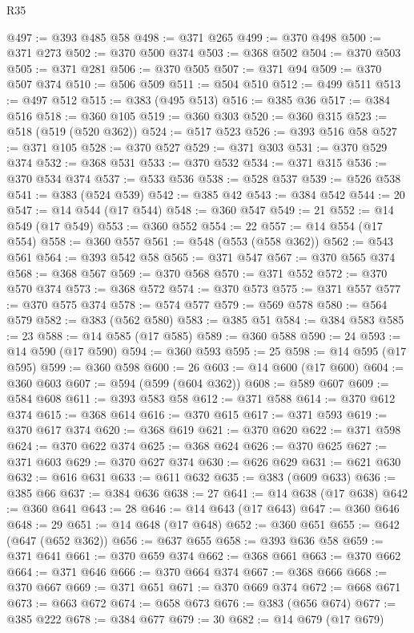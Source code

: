 \begin{lexlean}{R35}
\begin{coremodule}
{{{{{{{{{{{{{{{{{{{{{{{{{{{{{{{{{{{{{{{{{{{{{{{{{{{{@497 := @393 @485 @58
@498 := @371 @265
@499 := @370 @498
@500 := @371 @273
@502 := @370 @500 @374
@503 := @368 @502
@504 := @370 @503
@505 := @371 @281
@506 := @370 @505
@507 := @371 @94
@509 := @370 @507 @374
@510 := @506 @509
@511 := @504 @510
@512 := @499 @511
@513 := @497 @512
@515 := @383 (@495 @513)
@516 := @385 @36
@517 := @384 @516
@518 := @360 @105
@519 := @360 @303
@520 := @360 @315
@523 := @518 (@519 (@520 @362))
@524 := @517 @523
@526 := @393 @516 @58
@527 := @371 @105
@528 := @370 @527
@529 := @371 @303
@531 := @370 @529 @374
@532 := @368 @531
@533 := @370 @532
@534 := @371 @315
@536 := @370 @534 @374
@537 := @533 @536
@538 := @528 @537
@539 := @526 @538
@541 := @383 (@524 @539)
@542 := @385 @42
@543 := @384 @542
@544 := 20
@547 := @14 @544 (@17 @544)
@548 := @360 @547
@549 := 21
@552 := @14 @549 (@17 @549)
@553 := @360 @552
@554 := 22
@557 := @14 @554 (@17 @554)
@558 := @360 @557
@561 := @548 (@553 (@558 @362))
@562 := @543 @561
@564 := @393 @542 @58
@565 := @371 @547
@567 := @370 @565 @374
@568 := @368 @567
@569 := @370 @568
@570 := @371 @552
@572 := @370 @570 @374
@573 := @368 @572
@574 := @370 @573
@575 := @371 @557
@577 := @370 @575 @374
@578 := @574 @577
@579 := @569 @578
@580 := @564 @579
@582 := @383 (@562 @580)
@583 := @385 @51
@584 := @384 @583
@585 := 23
@588 := @14 @585 (@17 @585)
@589 := @360 @588
@590 := 24
@593 := @14 @590 (@17 @590)
@594 := @360 @593
@595 := 25
@598 := @14 @595 (@17 @595)
@599 := @360 @598
@600 := 26
@603 := @14 @600 (@17 @600)
@604 := @360 @603
@607 := @594 (@599 (@604 @362))
@608 := @589 @607
@609 := @584 @608
@611 := @393 @583 @58
@612 := @371 @588
@614 := @370 @612 @374
@615 := @368 @614
@616 := @370 @615
@617 := @371 @593
@619 := @370 @617 @374
@620 := @368 @619
@621 := @370 @620
@622 := @371 @598
@624 := @370 @622 @374
@625 := @368 @624
@626 := @370 @625
@627 := @371 @603
@629 := @370 @627 @374
@630 := @626 @629
@631 := @621 @630
@632 := @616 @631
@633 := @611 @632
@635 := @383 (@609 @633)
@636 := @385 @66
@637 := @384 @636
@638 := 27
@641 := @14 @638 (@17 @638)
@642 := @360 @641
@643 := 28
@646 := @14 @643 (@17 @643)
@647 := @360 @646
@648 := 29
@651 := @14 @648 (@17 @648)
@652 := @360 @651
@655 := @642 (@647 (@652 @362))
@656 := @637 @655
@658 := @393 @636 @58
@659 := @371 @641
@661 := @370 @659 @374
@662 := @368 @661
@663 := @370 @662
@664 := @371 @646
@666 := @370 @664 @374
@667 := @368 @666
@668 := @370 @667
@669 := @371 @651
@671 := @370 @669 @374
@672 := @668 @671
@673 := @663 @672
@674 := @658 @673
@676 := @383 (@656 @674)
@677 := @385 @222
@678 := @384 @677
@679 := 30
@682 := @14 @679 (@17 @679)
}}}}}}}}}}}}}}}}}}}}}}}}}}}}}}}}}}}}}}}}}}}}}}}}}}}}
\end{coremodule}
\end{lexlean}
